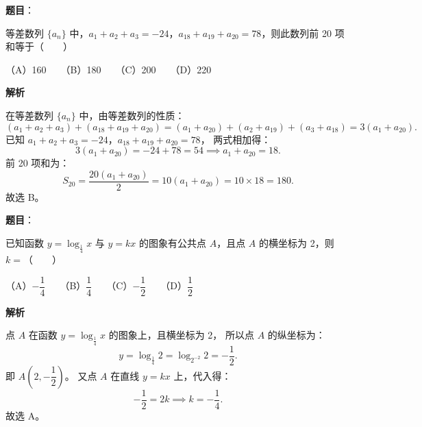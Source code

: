 \begin{answer}

\textbf{题目}：

等差数列 $\{a_n\}$ 中，$a_1+a_2+a_3=-24$，$a_{18}+a_{19}+a_{20}=78$，则此数列前 20 项和等于\mbox{（　　）}

（A）160　　（B）180　　（C）200　　（D）220

\textbf{解析}

在等差数列 $\{a_n\}$ 中，由等差数列的性质：
\nopagebreak[4]
\[
(a_1+a_2+a_3)+(a_{18}+a_{19}+a_{20})=(a_1+a_{20})+(a_2+a_{19})+(a_3+a_{18})=3(a_1+a_{20}).
\]
已知 $a_1+a_2+a_3=-24$，$a_{18}+a_{19}+a_{20}=78$，
两式相加得：
\nopagebreak[4]
\[
3(a_1+a_{20})=-24+78=54\implies a_1+a_{20}=18.
\]
前 20 项和为：
\nopagebreak[4]
\[
S_{20}=\frac{20(a_1+a_{20})}{2}=10(a_1+a_{20})=10\times 18=180.
\]
故选 B。


\end{answer}
\begin{answer}

\textbf{题目}：

已知函数 $y=\log_{\frac{1}{4}}x$ 与 $y=kx$ 的图象有公共点 $A$，且点 $A$ 的横坐标为 2，则 $k=$\mbox{（　　）}

（A）$-\dfrac{1}{4}$　　（B）$\dfrac{1}{4}$　　（C）$-\dfrac{1}{2}$　　（D）$\dfrac{1}{2}$

\textbf{解析}

点 $A$ 在函数 $y=\log_{\frac{1}{4}}x$ 的图象上，且横坐标为 2，
所以点 $A$ 的纵坐标为：
\nopagebreak[4]
\[
y=\log_{\frac{1}{4}}2=\log_{2^{-2}}2=-\frac{1}{2}.
\]
即 $A\left(2,-\dfrac{1}{2}\right)$。
又点 $A$ 在直线 $y=kx$ 上，代入得：
\nopagebreak[4]
\[
-\frac{1}{2}=2k\implies k=-\frac{1}{4}.
\]
故选 A。


\end{answer}
